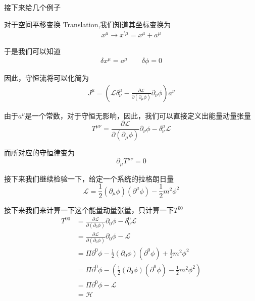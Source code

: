 接下来给几个例子
\begin{example}
    对于空间平移变换 Translation,我们知道其坐标变换为
    \begin{align*}
        x^\mu\to x^{\prime\mu}=x^\mu+a^\mu
    \end{align*}

    于是我们可以知道
    \begin{align*}
        \delta x^\mu=a^\mu\quad\quad\delta\phi=0
    \end{align*}

    因此，守恒流将可以化简为
    \begin{align*}
        J^\mu=\left(\mathcal{L}\delta^\mu_\nu-\frac{\partial\mathcal{L}}{\partial(\partial_\mu\phi)}\partial_\nu\phi\right)a^\nu
    \end{align*}

    由于$a^\nu$是一个常数，对于守恒无影响，因此，我们可以直接定义出能量动量张量
    \begin{equation*}
        T^{\mu\nu}=\frac{\partial\mathcal{L}}{\partial(\partial_\mu\phi)}\partial_\nu\phi-\delta^\mu_\nu\mathcal{L}
    \end{equation*}

    而所对应的守恒律变为
    \begin{equation*}
        \partial_\mu T^{\mu\nu}=0
    \end{equation*}

    接下来我们继续检验一下，给定一个系统的拉格朗日量
    \begin{equation*}
        \mathcal{L}=\frac{1}{2}(\partial_\mu\phi)(\partial^\mu\phi)-\frac{1}{2}m^2\phi^2
    \end{equation*}

    接下来我们来计算一下这个能量动量张量，只计算一下$T^{00}$
    \begin{align*}
        T^{00}&=\frac{\partial\mathcal{L}}{\partial(\partial_0\phi)}\partial_0\phi-\delta^0_0\mathcal{L}\\
        &=\frac{\partial\mathcal{L}}{\partial(\partial_0\phi)}\partial_0\phi-\mathcal{L}\\
        &=\Pi\partial^0\phi-\frac{1}{2}(\partial_0\phi)(\partial^0\phi)+\frac{1}{2}m^2\phi^2\\
        &=\Pi\partial^0\phi-\left(\frac{1}{2}(\partial_0\phi)(\partial^0\phi)-\frac{1}{2}m^2\phi^2\right)\\
        &=\Pi\partial^0\phi-\mathcal{L}\\
        &=\mathcal{H}
    \end{align*}
\end{example}

